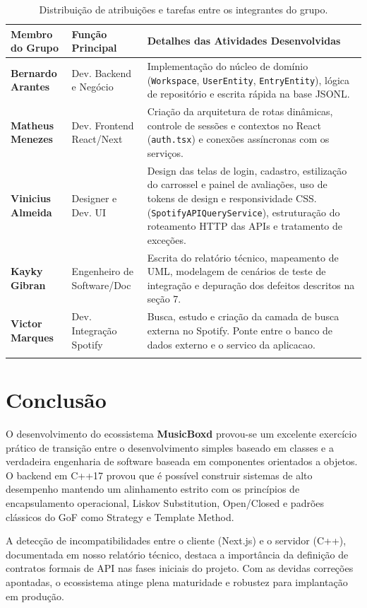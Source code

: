 \documentclass[12pt,a4paper]{article}
\begin{document}
\begin{table}[htbp]
    \centering
    \small
    \begin{tabular}{@{}llp{8.5cm}@{}}
        \toprule
        \textbf{Membro do Grupo} & \textbf{Função Principal} & \textbf{Detalhes das Atividades Desenvolvidas} \\ \midrule
        \textbf{Bernardo Arantes} & Dev. Backend e Negócio & Implementação do núcleo de domínio (\texttt{Workspace}, \texttt{UserEntity}, \texttt{EntryEntity}), lógica de repositório e escrita rápida na base JSONL. \\ \addlinespace
        \textbf{Matheus Menezes} & Dev. Frontend React/Next & Criação da arquitetura de rotas dinâmicas, controle de sessões e contextos no React (\texttt{auth.tsx}) e conexões assíncronas com os serviços. \\ \addlinespace
        \textbf{Vinicius Almeida} & Designer e Dev. UI & Design das telas de login, cadastro, estilização do carrossel e painel de avaliações, uso de tokens de design e responsividade CSS. (\texttt{SpotifyAPIQueryService}), estruturação do roteamento HTTP das APIs e tratamento de exceções. \\ \addlinespace
        \textbf{Kayky Gibran} & Engenheiro de Software/Doc & Escrita do relatório técnico, mapeamento de UML, modelagem de cenários de teste de integração e depuração dos defeitos descritos na seção 7. \\ 
        \textbf{Victor Marques} & Dev. Integração Spotify  & Busca, estudo e criação da camada de busca externa no Spotify. Ponte entre o banco de dados externo e o servico da aplicacao. \\ 
        \addlinespace
        \bottomrule
    \end{tabular}
    \caption{Distribuição de atribuições e tarefas entre os integrantes do grupo.}
    \label{tab:task_division}
\end{table}

\section{Conclusão}
O desenvolvimento do ecossistema \textbf{MusicBoxd} provou-se um excelente exercício prático de transição entre o desenvolvimento simples baseado em classes e a verdadeira engenharia de software baseada em componentes orientados a objetos. O backend em C++17 provou que é possível construir sistemas de alto desempenho mantendo um alinhamento estrito com os princípios de encapsulamento operacional, Liskov Substitution, Open/Closed e padrões clássicos do GoF como Strategy e Template Method.

A detecção de incompatibilidades entre o cliente (Next.js) e o servidor (C++), documentada em nosso relatório técnico, destaca a importância da definição de contratos formais de API nas fases iniciais do projeto. Com as devidas correções apontadas, o ecossistema atinge plena maturidade e robustez para implantação em produção.
\end{document}
